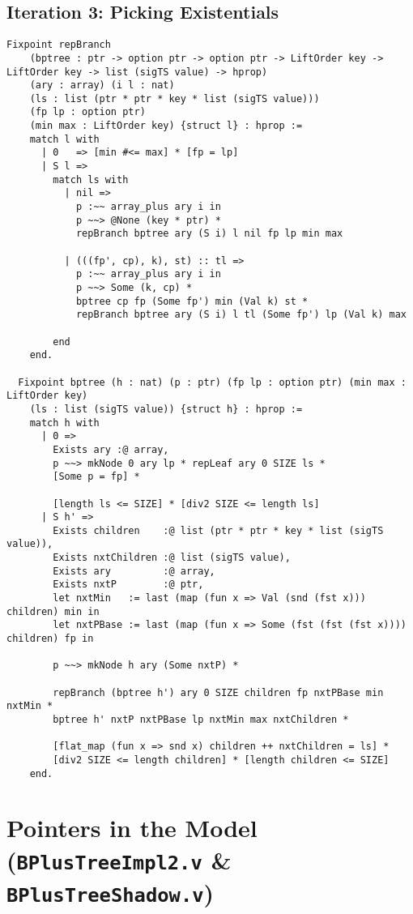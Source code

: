 \documentclass{article}
\begin{document}
\subsection{Iteration 3: Picking Existentials}
\begin{lstlisting}
Fixpoint repBranch
    (bptree : ptr -> option ptr -> option ptr -> LiftOrder key -> LiftOrder key -> list (sigTS value) -> hprop) 
    (ary : array) (i l : nat)
    (ls : list (ptr * ptr * key * list (sigTS value)))
    (fp lp : option ptr)
    (min max : LiftOrder key) {struct l} : hprop :=
    match l with
      | 0   => [min #<= max] * [fp = lp]
      | S l => 
        match ls with
          | nil =>
            p :~~ array_plus ary i in
            p ~~> @None (key * ptr) * 
            repBranch bptree ary (S i) l nil fp lp min max

          | (((fp', cp), k), st) :: tl =>
            p :~~ array_plus ary i in
            p ~~> Some (k, cp) *
            bptree cp fp (Some fp') min (Val k) st *
            repBranch bptree ary (S i) l tl (Some fp') lp (Val k) max

        end
    end.

  Fixpoint bptree (h : nat) (p : ptr) (fp lp : option ptr) (min max : LiftOrder key) 
    (ls : list (sigTS value)) {struct h} : hprop :=
    match h with
      | 0 =>
        Exists ary :@ array,
        p ~~> mkNode 0 ary lp * repLeaf ary 0 SIZE ls *
        [Some p = fp] *

        [length ls <= SIZE] * [div2 SIZE <= length ls]
      | S h' =>
        Exists children    :@ list (ptr * ptr * key * list (sigTS value)),
        Exists nxtChildren :@ list (sigTS value),
        Exists ary         :@ array,
        Exists nxtP        :@ ptr,
        let nxtMin   := last (map (fun x => Val (snd (fst x))) children) min in
        let nxtPBase := last (map (fun x => Some (fst (fst (fst x)))) children) fp in

        p ~~> mkNode h ary (Some nxtP) *

        repBranch (bptree h') ary 0 SIZE children fp nxtPBase min nxtMin *
        bptree h' nxtP nxtPBase lp nxtMin max nxtChildren *

        [flat_map (fun x => snd x) children ++ nxtChildren = ls] *
        [div2 SIZE <= length children] * [length children <= SIZE]
    end.
\end{lstlisting}

\newpage
\section{Pointers in the Model ({\tt BPlusTreeImpl2.v} \& {\tt BPlusTreeShadow.v})}
\end{document}

